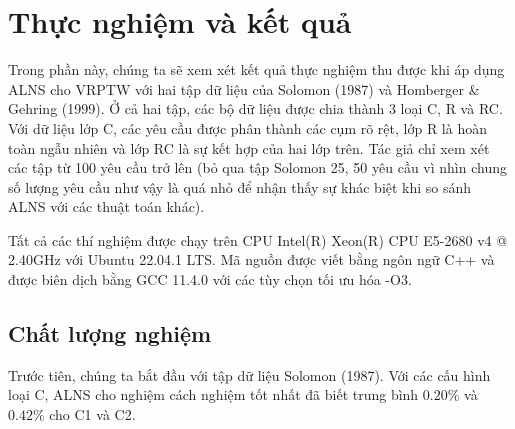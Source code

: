 \chapter{Thực nghiệm và kết quả}

Trong phần này, chúng ta sẽ xem xét kết quả thực nghiệm thu được khi áp dụng ALNS cho VRPTW với hai tập dữ liệu của Solomon (1987) và Homberger \& Gehring (1999). Ở cả hai tập, các bộ dữ liệu được chia thành 3 loại C, R và RC. Với dữ liệu lớp C, các yêu cầu được phân thành các cụm rõ rệt, lớp R là hoàn toàn ngẫu nhiên và lớp RC là sự kết hợp của hai lớp trên. Tác giả chỉ xem xét các tập từ 100 yêu cầu trở lên (bỏ qua tập Solomon 25, 50 yêu cầu vì nhìn chung số lượng yêu cầu như vậy là quá nhỏ để nhận thấy sự khác biệt khi so sánh ALNS với các thuật toán khác). 

Tất cả các thí nghiệm được chạy trên CPU Intel(R) Xeon(R) CPU E5-2680 v4 @ 2.40GHz với Ubuntu 22.04.1 LTS. Mã nguồn được viết bằng ngôn ngữ C++ và được biên dịch bằng GCC 11.4.0 với các tùy chọn tối ưu hóa -O3.

\section{Chất lượng nghiệm}

Trước tiên, chúng ta bắt đầu với tập dữ liệu Solomon (1987). Với các cấu hình loại C, ALNS cho nghiệm cách nghiệm tốt nhất đã biết trung bình $0.20\%$ và $0.42\%$ cho C1 và C2. 

